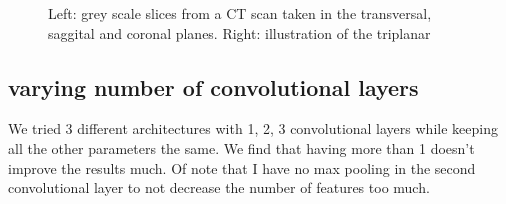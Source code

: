 \begin{figure}
\centering
\begin{minipage}{0.45\textwidth}
\centering
{}
\end{minipage}\hfill
\hspace{-1cm}
\begin{minipage}{0.45\textwidth}
\centering
{}
\end{minipage}
\caption{Left: grey scale slices from a CT scan taken in the transversal, saggital and coronal planes. Right: illustration of the triplanar}
\end{figure}

\subsection{varying number of convolutional layers}

We tried 3 different architectures with 1, 2, 3 convolutional layers while keeping all the other parameters the same. We find that having more than 1 doesn't improve the results much. Of note that I have no max pooling in the second convolutional layer to not decrease the number of features too much.

